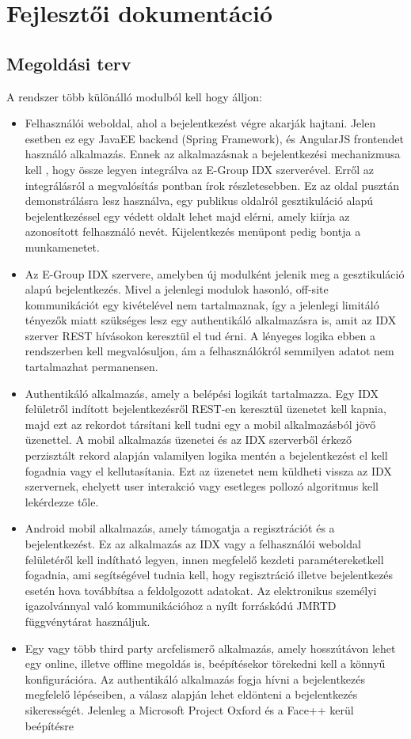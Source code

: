 \section{Fejlesztői dokumentáció}
\subsection{Megoldási terv}
A rendszer több különálló modulból kell hogy álljon:
\begin{itemize}
\item Felhasználói weboldal, ahol a bejelentkezést végre akarják hajtani. Jelen esetben ez egy JavaEE backend (Spring Framework), és AngularJS frontendet használó alkalmazás. Ennek az alkalmazásnak a bejelentkezési mechanizmusa kell , hogy össze legyen integrálva az E-Group IDX szerverével. Erről az integrálásról a megvalósítás pontban írok részletesebben. Ez az oldal pusztán demonstrálásra lesz használva, egy publikus oldalról gesztikuláció alapú bejelentkezéssel egy védett oldalt lehet majd elérni, amely kiírja az azonosított felhasználó nevét. Kijelentkezés menüpont pedig bontja a munkamenetet.
\item Az E-Group IDX szervere, amelyben új modulként jelenik meg a gesztikuláció alapú bejelentkezés. Mivel a jelenlegi modulok hasonló, off-site kommunikációt egy kivételével nem tartalmaznak, így a jelenlegi limitáló tényezők miatt szükséges lesz egy authentikáló alkalmazásra is, amit az IDX szerver REST hívásokon keresztül el tud érni. A lényeges logika ebben a rendszerben kell megvalósuljon, ám a felhasználókról semmilyen adatot nem tartalmazhat permanensen.
\item Authentikáló alkalmazás, amely a belépési logikát tartalmazza. Egy IDX felületről indított bejelentkezésről REST-en keresztül üzenetet kell kapnia, majd ezt az rekordot társítani kell tudni egy a mobil alkalmazásból jövő üzenettel. A mobil alkalmazás üzenetei és az IDX szerverből érkező perzisztált rekord alapján valamilyen logika mentén a bejelentkezést el kell fogadnia vagy el kellutasítania. Ezt az üzenetet nem küldheti vissza az IDX szervernek, ehelyett user interakció vagy esetleges pollozó algoritmus kell lekérdezze tőle.
\item Android mobil alkalmazás, amely támogatja a regisztrációt és a bejelentkezést. Ez az alkalmazás az IDX vagy a felhasználói weboldal felületéről kell indítható legyen, innen megfelelő kezdeti paramétereketkell fogadnia, ami segítségével tudnia kell, hogy regisztráció illetve bejelentkezés esetén hova továbbítsa a feldolgozott adatokat. Az elektronikus személyi igazolvánnyal való kommunikációhoz a nyílt forráskódú JMRTD függvénytárat használjuk.
\item Egy vagy több third party arcfelismerő alkalmazás, amely hosszútávon lehet egy online, illetve offline megoldás is, beépítésekor törekedni kell a könnyű konfigurációra. Az authentikáló alkalmazás fogja hívni a bejelentkezés megfelelő lépéseiben, a válasz alapján lehet eldönteni a bejelentkezés sikerességét. Jelenleg a Microsoft Project Oxford és a Face++ kerül beépítésre
\end{itemize}

